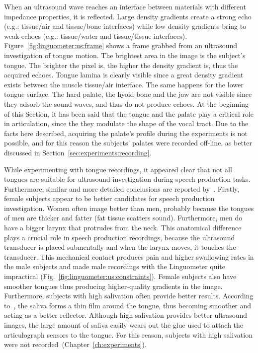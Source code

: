 
When an ultrasound wave reaches an interface between materials with different
impedance properties, it is reflected. Large density gradients create a strong
echo (e.g.: tissue/air and tissue/bone interfaces) while low density gradients
bring to weak echoes (e.g.: tissue/water and tissue/tissue interfaces).
Figure~\ref{fig:linguometer:us:frame} shows a frame grabbed from an ultrasound
investigation of tongue motion.
The brightest area in the image is the subject's tongue. The brighter the
pixel is, the higher the density gradient is, thus the acquired echoes.
Tongue lamina is clearly visible since a great density gradient exists between
the muscle tissue/air interface.
The same happens for the lower tongue surface.
The hard palate, the hyoid bone and the jaw are not visible since they adsorb
the sound waves, and thus do not produce echoes. 
At the beginning of this Section, it has been said that the tongue and the
palate play a critical role in articulation, since the they modulate the shape
of the vocal tract.
Due to the facts here described, acquiring the palate's profile during the
experiments is not possible, and for this reason the subjects' palates were
recorded off-line, as better discussed in
Section~\ref{sec:experiments:recording}.

While experimenting with tongue recordings, it appeared clear that not all
tongues are suitable for ultrasound investigation during speech production 
tasks.
Furthermore, similar and more detailed conclusions are reported
by~\citet{stone:2005}.
Firstly, female subjects appear to be better candidates for speech production
investigation. Women often image better than men, probably because the tongues
of men are thicker and fatter (fat tissue scatters sound).
Furthermore, men do have a bigger larynx that protrudes from the neck. This
anatomical difference plays a crucial role in speech production recordings,
because the ultrasound transducer is placed submentally and when the larynx
moves, it touches the transducer. 
This mechanical contact produces pain and higher swallowing rates in the
male subjects and made male recordings with the Linguometer quite impractical 
(Fig.~\ref{fig:linguometer:us:constraints}).
Female subjects also have smoother tongues thus producing higher-quality
gradients in the image.
Furthermore, subjects with high salivation often provide better results.
According to~\citet{stone:2005}, the saliva forms a thin film around the tongue,
thus becoming smoother and acting as a better reflector.
Although high salivation provides better ultrasound images, the large amount of
saliva easily wears out the glue used to attach the articulograph sensors to the
tongue. For this reason, subjects with high salivation were not
recorded~(Chapter~\ref{ch:experiments}).


